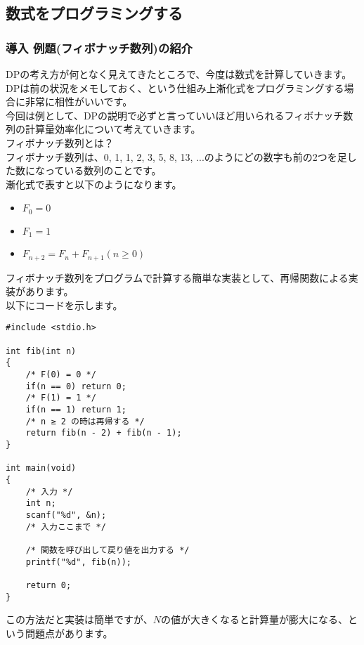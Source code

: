 \clearpage

\subsection{数式をプログラミングする}
\subsubsection{導入 例題(フィボナッチ数列)の紹介}

\noindent
DPの考え方が何となく見えてきたところで、今度は数式を計算していきます。\\
DPは前の状況をメモしておく、という仕組み上漸化式をプログラミングする場合に非常に相性がいいです。\\
今回は例として、DPの説明で必ずと言っていいほど用いられるフィボナッチ数列の計算量効率化について考えていきます。\\

\noindent
{\LARGE フィボナッチ数列とは？}\\

\noindent
フィボナッチ数列は、0, 1, 1, 2, 3, 5, 8, 13, ...のようにどの数字も前の2つを足した数になっている数列のことです。\\
漸化式で表すと以下のようになります。

\begin{itemize}
    \item $F_0 = 0$
    \item $F_1 = 1$
    \item $F_{n+2} = F_{n} + F_{n+1}(n \geq 0)$
\end{itemize}

\noindent
フィボナッチ数列をプログラムで計算する簡単な実装として、再帰関数による実装があります。\\
以下にコードを示します。

\begin{lstlisting}[style = customC]
#include <stdio.h>

int fib(int n)
{
    /* F(0) = 0 */
    if(n == 0) return 0;
    /* F(1) = 1 */
    if(n == 1) return 1;
    /* n ≥ 2 の時は再帰する */
    return fib(n - 2) + fib(n - 1);
}

int main(void) 
{
    /* 入力 */
    int n;
    scanf("%d", &n);
    /* 入力ここまで */

    /* 関数を呼び出して戻り値を出力する */
    printf("%d", fib(n));

    return 0; 
}
\end{lstlisting}

\noindent
この方法だと実装は簡単ですが、$N$の値が大きくなると計算量が膨大になる、という問題点があります。

